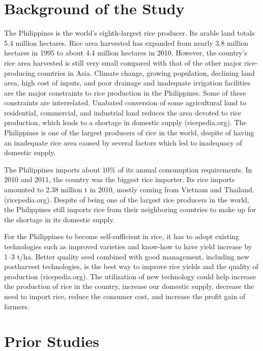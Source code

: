 \section{Background of the Study}

The Philippines is the world’s eighth-largest rice producer. Its arable land totals 5.4 million hectares. Rice area harvested has expanded from nearly 3.8 million hectares in 1995 to about 4.4 million hectares in 2010. However, the country’s rice area harvested is still very small compared with that of the other major rice-producing countries in Asia. Climate change, growing population, declining land area, high cost of inputs, and poor drainage and inadequate irrigation facilities are the major constraints to rice production in the Philippines. Some of these constraints are interrelated. Unabated conversion of some agricultural land to residential, commercial, and industrial land reduces the area devoted to rice production, which leads to a shortage in domestic supply (ricepedia.org). The Philippines is one of the largest producers of rice in the world, despite of having an inadequate rice area caused by several factors which led to inadequacy of domestic supply.   

The Philippines imports about 10\% of its annual consumption requirements. In 2010 and 2011, the country was the biggest rice importer. Its rice imports amounted to 2.38 million t in 2010, mostly coming from Vietnam and Thailand. (ricepedia.org). Despite of being one of the largest rice producers in the world, the Philippines still imports rice from their neighboring countries to make up for the shortage in its domestic supply.

For the Philippines to become self-sufficient in rice, it has to adopt existing technologies such as improved varieties and know-how to have yield increase by 1–3 t/ha. Better quality seed combined with good management, including new postharvest technologies, is the best way to improve rice yields and the quality of production (ricepedia.org). The utilization of new technology could help increase the production of rice in the country, increase our domestic supply, decrease the need to import rice, reduce the consumer cost, and increase the profit gain of farmers.


\section{Prior Studies}

